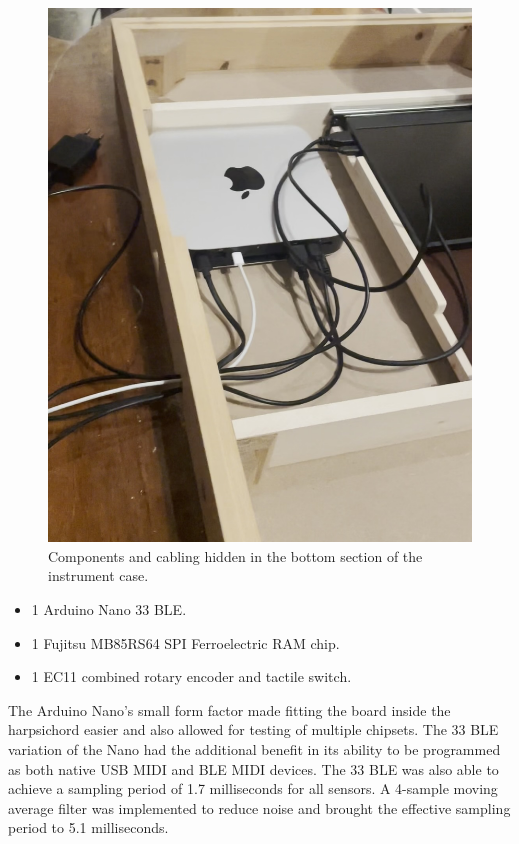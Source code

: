 \begin{figure}[!t]
    \centering
    \includegraphics[width=0.8\linewidth,trim={0 5cm 0 0},clip]{src/images/mac-mini.jpg}
    \caption{Components and cabling hidden in the bottom section of the instrument case.}
    \label{fig:mac-mini}
\end{figure}

\begin{itemize}
    \item 1 Arduino Nano 33 BLE.
    \item 1 Fujitsu MB85RS64 SPI Ferroelectric RAM chip.
    \item 1 EC11 combined rotary encoder and tactile switch.
\end{itemize}


The Arduino Nano's small form factor made fitting the board inside the harpsichord easier and also allowed for testing of multiple chipsets. The 33 BLE variation of the Nano had the additional benefit in its ability to be programmed as both native USB MIDI and BLE MIDI devices. The 33 BLE was also able to achieve a sampling period of 1.7 milliseconds for all sensors. A 4-sample moving average filter was implemented to reduce noise and brought the effective sampling period to 5.1 milliseconds.

